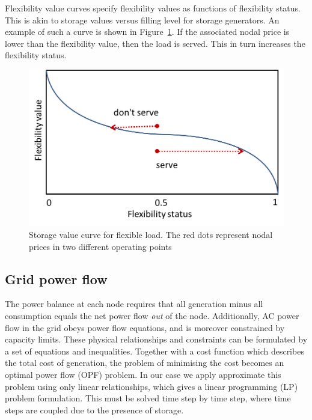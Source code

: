 \documentclass{article}
\begin{document}
Flexibility value curves specify flexibility values as functions of flexibility status. This is akin to storage values versus filling level for storage generators.
An example of such a curve is shown in Figure~\ref{fig:flexvalue_curve}.
If the associated nodal price is lower than the flexibility value, then the load is served. This in turn increases the flexibility status.


\begin{figure}
\centering
\includegraphics[scale=0.6]{flexvalues.png}
\caption{Storage value curve for flexible load. The red dots represent nodal prices in two different operating points }
\label{fig:flexvalue_curve}
\end{figure}




\subsection{Grid power flow}

The power balance at each node  requires that all generation minus all consumption equals the net power flow \emph{out} of the node. Additionally, AC power flow in the grid obeys power flow equations, and is moreover constrained by capacity limits. These physical relationships and constraints can be formulated  by a set of equations and inequalities. Together with a cost function which describes the total cost of generation, the problem of minimising the cost becomes an optimal power flow (OPF) problem. In our case we apply approximate this problem using only linear relationships, which gives a linear programming (LP) problem formulation. This must be solved time step by time step, where time steps are coupled due to the presence of storage.
\end{document}
